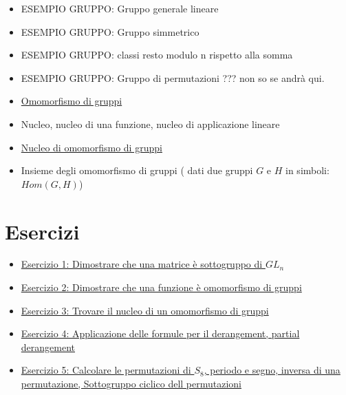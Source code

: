 \documentclass[a4paper,10pt]{article}
\begin{document}
\begin{itemize}
 \item ESEMPIO GRUPPO: Gruppo generale lineare
 \item ESEMPIO GRUPPO: Gruppo simmetrico 
 \item ESEMPIO GRUPPO: classi resto modulo n rispetto alla somma
 \item ESEMPIO GRUPPO: Gruppo di permutazioni ??? non so se andrà qui.
 
 \item \href{./OmomorfismoGruppi.html}{Omomorfismo di gruppi}
 \item Nucleo, nucleo di una funzione, nucleo di applicazione lineare
 \item \href{./Nucleo.html}{Nucleo di omomorfismo di gruppi}
 \item Insieme degli omomorfismo di gruppi ( dati due gruppi $G$ e $H$ in simboli: $Hom(G,H)$)
 
\end{itemize}

\section{Esercizi}
\begin{itemize}
 \item \href{./esercizio1.html}{Esercizio 1: Dimostrare che una matrice è sottogruppo di $GL_{n}$}
 \item \href{./esercizio2.html}{Esercizio 2: Dimostrare che una funzione è omomorfismo di gruppi}
 \item \href{./esercizio3.html}{Esercizio 3: Trovare il nucleo di un omomorfismo di gruppi}
 \item \href{./esercizio4.html}{Esercizio 4: Applicazione delle formule per il derangement, partial derangement}
 \item \href{./esercizio5.html}{Esercizio 5: Calcolare le permutazioni di $S_{8}$, periodo e segno, inversa di una permutazione, Sottogruppo ciclico dell permutazioni}
\end{itemize}
\end{document}
